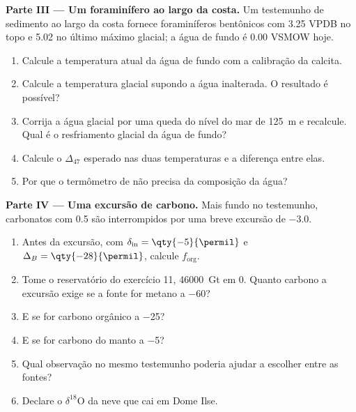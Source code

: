 \begin{problem}
\medskip\noindent\textbf{Parte III --- Um foraminífero ao largo da costa.} Um
testemunho de sedimento ao largo da costa fornece foraminíferos bentônicos com \qty{3.25}{\permil}
VPDB no topo e \qty{5.02}{\permil} no último máximo glacial; a água de fundo
é \qty{0.00}{\permil} VSMOW hoje.
\begin{enumerate}[resume]
\item Calcule a temperatura atual da água de fundo com a
calibração da calcita.
\item Calcule a temperatura glacial supondo a água inalterada. O
resultado é possível?
\item Corrija a água glacial por uma queda do nível do mar de \qty{125}{m} e
recalcule. Qual é o resfriamento glacial da água de fundo?
\item Calcule o $\Delta_{47}$ esperado nas duas temperaturas e a
diferença entre elas.
\item Por que o termômetro de  não precisa da
composição da água?
\end{enumerate}

\medskip\noindent\textbf{Parte IV --- Uma excursão de carbono.} Mais fundo no
testemunho, carbonatos com \qty{+0.5}{\permil} são interrompidos por uma breve
excursão de \qty{-3.0}{\permil}.
\begin{enumerate}[resume]
\item Antes da excursão, com $\delta_{\mathrm{in}} = \qty{-5}{\permil}$ e
$\Delta_B = \qty{-28}{\permil}$, calcule $f_{\mathrm{org}}$.
\item Tome o reservatório do exercício 11, \qty{46000}{Gt} em 0. Quanto carbono
a excursão exige se a fonte for metano a \qty{-60}{\permil}?
\item E se for carbono orgânico a \qty{-25}{\permil}?
\item E se for carbono do manto a \qty{-5}{\permil}?
\item Qual observação no mesmo testemunho poderia ajudar a escolher entre
as fontes?
\item Declare o $\delta^{18}\mathrm O$ da neve que cai em Dome Ilse.
\end{enumerate}
\end{problem}
